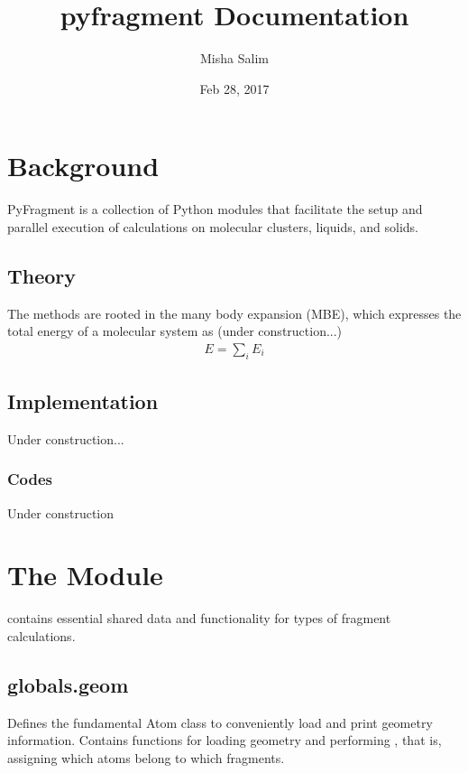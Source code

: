 \documentclass[letterpaper,10pt,english]{sphinxmanual}
\title{pyfragment Documentation}
\date{Feb 28, 2017}
\author{Misha Salim}
\begin{document}
\maketitle
\sphinxtableofcontents
{}\label{\detokenize{index::doc}}



\chapter{Background}
\label{\detokenize{background::doc}}\label{\detokenize{background:pyfragment-documentation}}\label{\detokenize{background:background}}
PyFragment is a collection of Python modules that facilitate the setup and
parallel execution of  calculations on molecular clusters,
liquids, and solids.


\section{Theory}
\label{\detokenize{background:theory}}
The  methods are rooted in the many body expansion (MBE),
which expresses the total energy of a molecular system as (under
construction...)
\begin{equation*}
\begin{split}E = \sum_{i} E_{i}\end{split}
\end{equation*}

\section{Implementation}
\label{\detokenize{background:implementation}}
Under construction...


\subsection{Codes}
\label{\detokenize{background:codes}}
Under construction


\chapter{The  Module}
\label{\detokenize{globals::doc}}\label{\detokenize{globals:the-globals-module}}
 contains essential shared data and functionality for  types of fragment calculations.


\section{globals.geom}
\label{\detokenize{globals:globals-geom}}
Defines the fundamental Atom class to conveniently load and print geometry
information.  Contains functions for loading geometry and performing
, that is, assigning which atoms belong to which fragments.
\label{\detokenize{globals:module-globals.geom}}
\end{document}
